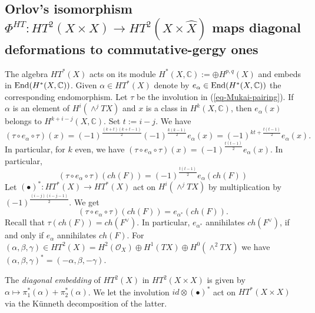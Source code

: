 \documentclass[12pt]{amsart}
\newcommand{\hide}[1]{}
\numberwithin{equation}{subsection}
\theoremstyle{plain}
\newtheorem{lem}[thm]{Lemma}
\theoremstyle{definition}
\newcommand{\CC}{{\mathbb C}}
\newcommand{\StructureSheaf}[1]{{\mathcal O}_{#1}}
\newcommand{\End}{{\rm End}}
\begin{document}
% 
\subsection{Orlov's isomorphism $\Phi^{HT}:HT^2(X\times X)\rightarrow HT^2(X\times\hat{X})$ maps diagonal deformations to commutative-gergy ones}
\label{sec-diaginal-deformations}

The algebra $HT^*(X)$ acts on its module $H^*(X,\CC):=\oplus H^{p,q}(X)$ and embeds in $\End(H^*(X,\CC))$.
Given $\alpha\in HT^*(X)$ denote by $e_\alpha\in \End(H^*(X,\CC))$ the corresponding endomorphism.
Let $\tau$ be the involution in (\ref{eq-Mukai-pairing}).
If $\alpha$ is an element of $H^i(\wedge^jTX)$ and $x$ is a class in $H^k(X,\CC)$, then $e_\alpha(x)$ belongs to  $H^{k+i-j}(X,\CC)$. Set $t:=i-j$. We have
\[
(\tau\circ e_\alpha\circ \tau)(x) = (-1)^{\frac{(k+t)(k+t-1)}{2}}(-1)^{\frac{k(k-1)}{2}}e_\alpha(x)=(-1)^{kt+\frac{t(t-1)}{2}}e_\alpha(x).
\]
In particular, for $k$ even, we have $(\tau\circ e_\alpha\circ \tau)(x) =(-1)^{\frac{t(t-1)}{2}}e_\alpha(x)$. In particular,
\[
(\tau\circ e_\alpha\circ \tau)(ch(F)) =(-1)^{\frac{t(t-1)}{2}}e_\alpha(ch(F))
\]
Let $(\bullet)^*:HT^*(X)\rightarrow HT^*(X)$ act on $H^i(\wedge^jTX)$ by multiplication by $(-1)^{\frac{(i-j)(i-j-1)}{2}}$.
We get 
\begin{equation}
\label{eq-conjugation-of-HT-algebra-by-tau}
(\tau\circ e_\alpha\circ \tau)(ch(F)) = e_{\alpha^*}(ch(F)).
\end{equation}
Recall that $\tau(ch(F))=ch(F^\vee)$.
In particular, $e_{\alpha^*}$ annihilates $ch(F^\vee)$, if and only if $e_\alpha$ annihilates $ch(F)$.
For $(\alpha,\beta,\gamma)\in HT^2(X)=H^2(\StructureSheaf{X})\oplus H^1(TX)\oplus H^0(\wedge^2TX)$ we have
$(\alpha,\beta,\gamma)^*=(-\alpha,\beta,-\gamma).$

The {\em diagonal embedding} of $HT^2(X)$ in $HT^2(X\times X)$ is given by $\alpha\mapsto \pi_1^*(\alpha)+\pi_2^*(\alpha)$. 
We let the involution $id\otimes (\bullet)^*$ act on $HT^*(X\times X)$ via the K\"{u}nneth decomposition of the latter.


\hide{
\begin{lem}
The intersection
\begin{eqnarray*}
&&
\left[\pi_1^*HT^2(X)\oplus\pi_2^*HT^2(X)
\right]\cap 
(\Phi^{HT})^{-1}\left(
H^2(\StructureSheaf{X\times \hat{X}})\oplus H^1(T[X\times \hat{X}])
\right) 
\end{eqnarray*}
is equal to the diagonal embedding of $H^1(TX)$ and the anti-diagonal embedding of 
$H^2(\StructureSheaf{X})\oplus H^0(\wedge^2TX)$.
\end{lem}
}
\end{document}
